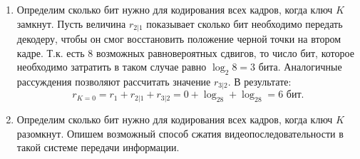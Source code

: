 \begin{enumerate}

\item Определим сколько бит нужно для кодирования всех кадров, когда ключ $K$ замкнут. Пусть величина $r_{2 \vert 1}$ показывает сколько бит необходимо передать декодеру, чтобы он смог восстановить положение черной точки на втором кадре. Т.к. есть 8 возможных равновероятных сдвигов, то число бит, которое необходимо затратить в таком случае равно $\log_{2}8=3$ бита. Аналогичные рассуждения позволяют рассчитать значение $r_{3 \vert 2}$. В результате:
\begin{equation*}
r_{K=0} = r_1 + r_{2 \vert 1} + r_{3 \vert 2} = 0 + \log_28 + \log_28 = 6\text{ бит}.
\end{equation*}

\item Определим сколько бит нужно для кодирования всех кадров, когда ключ $K$ разомкнут. Опишем возможный способ сжатия видеопоследовательности в такой системе передачи информации.


\end{enumerate}
